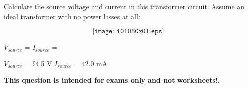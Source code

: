 

Calculate the source voltage and current in this transformer circuit.  Assume an ideal transformer with no power losses at all:

$$\texttt{[image: i01080x01.eps]}$$

$V_{source}$ = \hskip 80pt $I_{source}$ =

\vskip 10pt







$V_{source}$ = 94.5 V \hskip 80pt $I_{source}$ = 42.0 mA







{\bf This question is intended for exams only and not worksheets!}.




